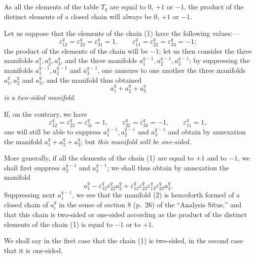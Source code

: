 \documentclass{article}
\begin{document}
As all the elements of the table $T_{q}$ are equal to 0, $+1$ or $-1$, the product of the distinct elements of a closed chain will always be 0, $+1$ or $-1$.

Let us suppose that the elements of the chain (1) have the following values:---
\[ \varepsilon^{q}_{12} = \varepsilon^{q}_{23} = \varepsilon^{q}_{31} = 1, \qquad \varepsilon^{q}_{11} = \varepsilon^{q}_{22} = \varepsilon^{q}_{33} = -1; \]
the product of the elements of the chain will be $-1$; let us then consider the three manifolds $a^{q}_{1}, a^{q}_{2}, a^{q}_{3}$, and the three manifolds $a^{q-1}_{1}, a^{q-1}_{2}, a^{q-1}_{3}$; by suppressing the manifolds $a^{q-1}_{1}, a^{q-1}_{2}$ and $a^{q-1}_{3}$, one annexes to one another the three manifolds $a^{q}_{1}, a^{q}_{2}$ and $a^{q}_{3}$, and the manifold thus obtained
\[ a^{q}_{1} + a^{q}_{2} + a^{q}_{3} \]
\emph{is a two-sided manifold}.

If, on the contrary, we have
\[ \varepsilon^{q}_{12} = \varepsilon^{q}_{23} = \varepsilon^{q}_{31} = 1, \qquad \varepsilon^{q}_{22} = \varepsilon^{q}_{33} = -1, \qquad \varepsilon^{q}_{11} = 1, \]
one will still be able to suppress $a^{q-1}_{1}, a^{q-1}_{2}$ and $a^{q-1}_{3}$ and obtain by annexation the manifold $a^{q}_{1} + a^{q}_{2} + a^{q}_{3}$; but \emph{this manifold will be one-sided}.

More generally, if all the elements of the chain (1) are equal
to $+1$ and to $-1$, we shall first suppress $a^{q-1}_{2}$ and $a^{q-1}_{3}$; we shall thus obtain by annexation the manifold
\[ a^{q}_{1} - \varepsilon^{q}_{12} \varepsilon^{q}_{22} a^{q}_{2} + \varepsilon^{q}_{12} \varepsilon^{q}_{22} \varepsilon^{q}_{13} \varepsilon^{q}_{23} a^{q}_{3}. \tag{2} \]
Suppressing next $a^{q-1}_{1}$, we see that the manifold (2) is henceforth formed of a closed chain of $a^{q}_{i}$ in the sense of section 8 (p.\ 26) of the “Analysis Situs,” and that this chain is two-sided or one-sided according as the product of the distinct elements of the chain (1) is equal to $-1$ or to $+1$.

We shall say in the first case that the chain (1) is two-sided, in the second case that it is one-sided.
\end{document}
